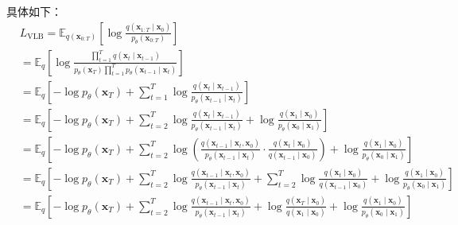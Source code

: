 \documentclass[lang=cn,newtx,10pt,scheme=chinese]{elegantbook}
\begin{document}
具体如下：
\begin{equation}
\begin{aligned}
& L_{\mathrm{VLB}}=\mathbb{E}_{q\left(\mathbf{x}_{0: T}\right)}\left[\log \frac{q\left(\mathbf{x}_{1: T} \mid \mathbf{x}_0\right)}{p_\theta\left(\mathbf{x}_{0: T}\right)}\right] \\
& =\mathbb{E}_q\left[\log \frac{\prod_{t=1}^T q\left(\mathbf{x}_t \mid \mathbf{x}_{t-1}\right)}{p_\theta\left(\mathbf{x}_T\right) \prod_{t=1}^T p_\theta\left(\mathbf{x}_{t-1} \mid \mathbf{x}_t\right)}\right] \\
& =\mathbb{E}_q\left[-\log p_\theta\left(\mathbf{x}_T\right)+\sum_{t=1}^T \log \frac{q\left(\mathbf{x}_t \mid \mathbf{x}_{t-1}\right)}{p_\theta\left(\mathbf{x}_{t-1} \mid \mathbf{x}_t\right)}\right] \\
& =\mathbb{E}_q\left[-\log p_\theta\left(\mathbf{x}_T\right)+\sum_{t=2}^T \log \frac{q\left(\mathbf{x}_t \mid \mathbf{x}_{t-1}\right)}{p_\theta\left(\mathbf{x}_{t-1} \mid \mathbf{x}_t\right)}+\log \frac{q\left(\mathbf{x}_1 \mid \mathbf{x}_0\right)}{p_\theta\left(\mathbf{x}_0 \mid \mathbf{x}_1\right)}\right] \\
& =\mathbb{E}_q\left[-\log p_\theta\left(\mathbf{x}_T\right)+\sum_{t=2}^T \log \left(\frac{q\left(\mathbf{x}_{t-1} \mid \mathbf{x}_t, \mathbf{x}_0\right)}{p_\theta\left(\mathbf{x}_{t-1} \mid \mathbf{x}_t\right)} \cdot \frac{q\left(\mathbf{x}_t \mid \mathbf{x}_0\right)}{q\left(\mathbf{x}_{t-1} \mid \mathbf{x}_0\right)}\right)+\log \frac{q\left(\mathbf{x}_1 \mid \mathbf{x}_0\right)}{p_\theta\left(\mathbf{x}_0 \mid \mathbf{x}_1\right)}\right] \\
& =\mathbb{E}_q\left[-\log p_\theta\left(\mathbf{x}_T\right)+\sum_{t=2}^T \log \frac{q\left(\mathbf{x}_{t-1} \mid \mathbf{x}_t, \mathbf{x}_0\right)}{p_\theta\left(\mathbf{x}_{t-1} \mid \mathbf{x}_t\right)}+\sum_{t=2}^T \log \frac{q\left(\mathbf{x}_t \mid \mathbf{x}_0\right)}{q\left(\mathbf{x}_{t-1} \mid \mathbf{x}_0\right)}+\log \frac{q\left(\mathbf{x}_1 \mid \mathbf{x}_0\right)}{p_\theta\left(\mathbf{x}_0 \mid \mathbf{x}_1\right)}\right] \\
& =\mathbb{E}_q\left[-\log p_\theta\left(\mathbf{x}_T\right)+\sum_{t=2}^T \log \frac{q\left(\mathbf{x}_{t-1} \mid \mathbf{x}_t, \mathbf{x}_0\right)}{p_\theta\left(\mathbf{x}_{t-1} \mid \mathbf{x}_t\right)}+\log \frac{q\left(\mathbf{x}_T \mid \mathbf{x}_0\right)}{q\left(\mathbf{x}_1 \mid \mathbf{x}_0\right)}+\log \frac{q\left(\mathbf{x}_1 \mid \mathbf{x}_0\right)}{p_\theta\left(\mathbf{x}_0 \mid \mathbf{x}_1\right)}\right] \\

\end{aligned}
\end{equation}
\end{document}
